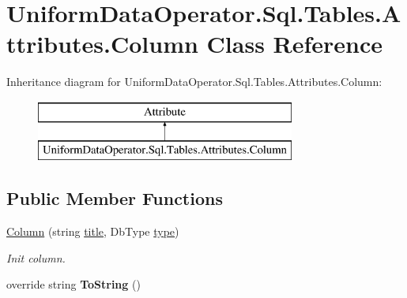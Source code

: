 \hypertarget{class_uniform_data_operator_1_1_sql_1_1_tables_1_1_attributes_1_1_column}{}\section{Uniform\+Data\+Operator.\+Sql.\+Tables.\+Attributes.\+Column Class Reference}
\label{class_uniform_data_operator_1_1_sql_1_1_tables_1_1_attributes_1_1_column}
Inheritance diagram for Uniform\+Data\+Operator.\+Sql.\+Tables.\+Attributes.\+Column\+:\begin{figure}[H]
\begin{center}
\leavevmode
\includegraphics[height=2.000000cm]{d2/da8/class_uniform_data_operator_1_1_sql_1_1_tables_1_1_attributes_1_1_column}
\end{center}
\end{figure}
\subsection*{Public Member Functions}
\begin{DoxyCompactItemize}
\item 
\mbox{\hyperlink{class_uniform_data_operator_1_1_sql_1_1_tables_1_1_attributes_1_1_column_a6eeb1553abe902c6bd4a8c60204785f6}{Column}} (string \mbox{\hyperlink{class_uniform_data_operator_1_1_sql_1_1_tables_1_1_attributes_1_1_column_a5f723f7b56e2765e2515010288ada510}{title}}, Db\+Type \mbox{\hyperlink{class_uniform_data_operator_1_1_sql_1_1_tables_1_1_attributes_1_1_column_aaa92c4d6a084014da5a521eab2c8a377}{type}})
\begin{DoxyCompactList}\small\item\em Init column. \end{DoxyCompactList}\item 
\mbox{\label{class_uniform_data_operator_1_1_sql_1_1_tables_1_1_attributes_1_1_column_a612147cabed854496889fc507b0414a9}} 
override string {\bfseries To\+String} ()
\end{DoxyCompactItemize}
